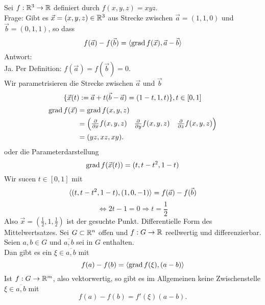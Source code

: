 \documentclass[../ana2u.tex]{subfiles}
\begin{document}
\begin{bsp}
    Sei \( f:\mathbb{R}^3\rightarrow \mathbb{R} \) definiert durch 
    \( f(x,y,z) = xyz \).\\
    Frage: Gibt es \( \vec{x} = (x,y,z) \in \mathbb{R}^3 \) aus Strecke 
    zwischen \( \vec{a} = (1,1,0) \) und \( \vec{b} 
    = (0,1,1) \), so dass 
    \[ f(\vec{a}) - f(\vec{b}) = \langle  \operatorname{grad} f(\vec{x}), \vec{a}-\vec{b} \rangle \]
    Antwort: \\ 
    Ja. Per Definition: 
    \( f(\vec{a}) = f(\vec{b}) = 0 \).\\
    Wir parametrisieren die Strecke zwischen \( \vec{a} \) 
    und \( \vec{b} \) 
    \[ \{\vec{x}(t) := \vec{a} + t(\vec{b}-\vec{a}) = (1-t, 1, t)\}, t \in [0,1] \]
    \begin{align*}
        \operatorname{grad} f(\vec{x}) &= \operatorname{grad} f(x, y, z) \\
        &= \begin{pmatrix}
            \frac{\partial}{\partial x} f(x,y,z) & \frac{\partial}{\partial y} f(x,y,z) & \frac{\partial}{\partial z} f(x,y,z)
        \end{pmatrix} \\
        &= (yz, xz, xy).
    \end{align*}
    oder die Parameterdarstellung 
    \[ \operatorname{grad} f(\vec{x}(t)) = (t, t - t^2, 1 - t) \]
    Wir sucen \( t \in [0,1] \) mit 
    \[ \langle  (t, t - t^2, 1 - t) , (1,0,-1) \rangle 
    = f(\vec{a}) - f(\vec{b}) \]
    \[ \Leftrightarrow 2t-1 = 0 \Rightarrow t = \frac{1}{2} \]
    Also \( \vec{x} = (\frac{1}{2}, 1, \frac{1}{2}) \) 
    ist der gesuchte Punkt.
    Differentielle Form des Mittelwertsatzes.
    Sei \( G \subset \mathbb{R}^n \) offen und \( f:G\rightarrow \mathbb{R} \) 
    reellwertig und differenzierbar. Seien \( a, b \in G \) 
    und \( \overline{a,b} \) sei in \( G \) enthalten.\\
    Dan gibt es ein \( \xi \in \overline{a,b} \) mit 
    \[ f(a)-f(b) = \langle \operatorname{grad} f(\xi), (a-b) \rangle \]
    Ist \( f:G\rightarrow \mathbb{R}^m \), also vektorwertig, 
    so gibt es im Allgemeinen keine Zwischenstelle 
    \( \xi \in \overline{a,b} \) mit 
    \[ f(a) - f(b) = f'(\xi) (a - b). \]
\end{bsp}
\end{document}
